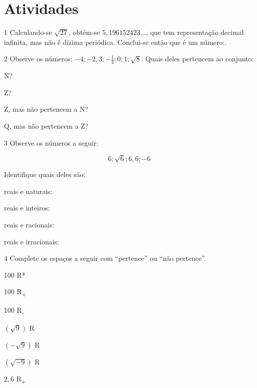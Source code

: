 \section*{Atividades}

\num{1} Calculando-se $\sqrt{27}$, obtém-se $5,196152423$..., que tem
representação decimal infinita, mas não é dízima periódica.
Conclui-se então que é um número:.



\num{2} Observe os números: $-4; -2,3; -\frac{1}{4}; 0; 1; \sqrt{8}$. Quais deles pertencem ao conjunto:





\begin{escolha}[itemsep=0pt]
\item N? 
\item Z? 
\item Z, mas não pertencem a N? 
\item Q, mas não pertencem a Z? 
\end{escolha}

\pagebreak

\num{3} Observe os números a seguir:

$$6; \sqrt{6}; 6,6; -6$$


Identifique quais deles são:
\begin{escolha}[itemsep=0pt]
\item reais e naturais: \reduline{6\hfill}
\item reais e inteiros: 
\item reais e racionais: 
\item reais e irracionais: 
\end{escolha}


\num{4} Complete os espaços a seguir com ``pertence'' ou ``não pertence''.


\begin{escolha}[itemsep=0pt]
\item 100  R*
\item 100  R\textsubscript{+}
\item 100  R\textsubscript{-}
\item $(\sqrt{9})$  R
\item $(-\sqrt{9})$  R
\item $(\sqrt{- 9})$  R
\item $2,6$  R\textsubscript{+}
\end{escolha}


